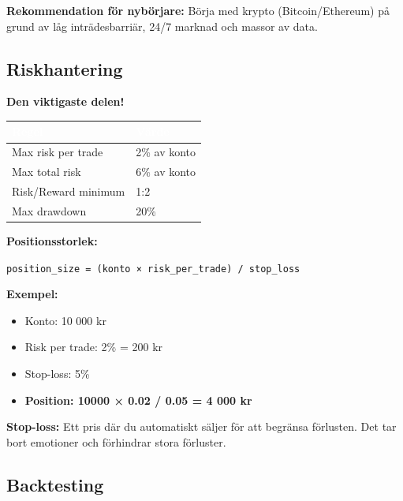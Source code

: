 \documentclass[12pt,a4paper,swedish]{article}
\begin{document}
\bigskip

\color{success}\textbf{Rekommendation för nybörjare:}\color{black} Börja med krypto (Bitcoin/Ethereum) på grund av låg inträdesbarriär, 24/7 marknad och massor av data.

\subsection{Riskhantering}
\label{sec:risk}

\color{warning}\textbf{Den viktigaste delen!}\color{black}

\bigskip

\begin{center}
\begin{tabular}{|p{6cm}|p{6cm}|}
\hline
\rowcolor{warning}
\textcolor{white}{\textbf{Regel}} & \textcolor{white}{\textbf{Värde}} \\
\hline
Max risk per trade & 2\% av konto \\
\hline
Max total risk & 6\% av konto \\
\hline
Risk/Reward minimum & 1:2 \\
\hline
Max drawdown & 20\% \\
\hline
\end{tabular}
\end{center}

\bigskip

\textbf{Positionsstorlek:}

\begin{center}
\texttt{position\_size = (konto × risk\_per\_trade) / stop\_loss}
\end{center}

\bigskip

\textbf{Exempel:}
\begin{itemize}
    \item Konto: 10 000 kr
    \item Risk per trade: 2\% = 200 kr
    \item Stop-loss: 5\%
    \item \textbf{Position: 10000 × 0.02 / 0.05 = 4 000 kr}
\end{itemize}

\bigskip

\textbf{Stop-loss:} Ett pris där du automatiskt säljer för att begränsa förlusten. Det tar bort emotioner och förhindrar stora förluster.

\subsection{Backtesting}
\label{sec:backtest}
\end{document}
